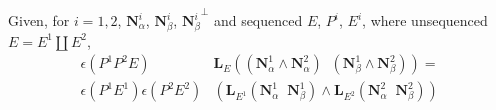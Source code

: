 \documentclass[Unicode]{cedram-alco}
\newcommand{\ext}[1]{\ensuremath{\mathbf{#1}}}
\newcommand{\dunion}{\coprod}
\newcommand{\LHorSub}[3]{\ext{L}_{#1}\left(  {#2}\;\; {#3}  \right)}
\begin{document}
\begin{theo}
Given, for $i = 1, 2$,
  $\ext{N}_\alpha^{i}$,  $\ext{N}_\beta^{i}$, ${\ext{N}_\beta^{i}}^\perp$ 
  and
  sequenced $E$, $P^{i}$, $E^{i}$, where unsequenced $E=E^{1}\dunion E^{2}$,
  \begin{equation}\label{productequation}
    \begin{split}
    \epsilon(P^1P^2E)
    &\LHorSub{E}
            {(\ext{N}_\alpha^{1}\wedge\ext{N}_\alpha^{2})}
            {(\ext{N}_\beta^{1}\wedge\ext{N}_\beta^{2})}
    = \\
    \epsilon(P^{1}E^{1})
    \epsilon(P^{2}E^{2}) 
        &\left(\LHorSub{E^{1}}{\ext{N}_\alpha^{1}}{\ext{N}_\beta^{1}}
        \wedge
        \LHorSub{E^{2}}{\ext{N}_\alpha^{2}}{\ext{N}_\beta^{2}}
          \right)
    \end{split}
  \end{equation}
\end{theo}
\end{document}
